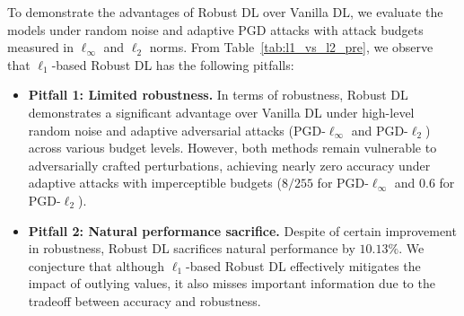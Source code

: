 To demonstrate the advantages of Robust DL over Vanilla DL, we evaluate the models under random noise and adaptive PGD attacks with attack budgets measured in $\ell_\infty$ and $\ell_2$ norms.
From Table~\ref{tab:l1_vs_l2_pre}, we observe that $\ell_1$-based Robust DL has the following pitfalls:
\begin{itemize}[left=0.0em]
\vspace{-0.1in}
\item \textbf{Pitfall 1: Limited robustness.} In terms of robustness, Robust DL demonstrates a significant advantage over Vanilla DL under high-level random noise and adaptive adversarial attacks (PGD-$\ell_\infty$ and PGD-$\ell_2$) across various budget levels. However, both methods remain vulnerable to adversarially crafted perturbations, achieving nearly zero accuracy under adaptive attacks with imperceptible budgets ($8/255$ for PGD-$\ell_\infty$ and $0.6$ for PGD-$\ell_2$).
\item \textbf{Pitfall 2: Natural performance sacrifice.} Despite of certain improvement in robustness, Robust DL sacrifices natural performance by $10.13\%$. We conjecture that although $\ell_1$-based Robust DL effectively mitigates the impact of outlying values, it also misses important information due to the tradeoff between accuracy and robustness.


\end{itemize}


